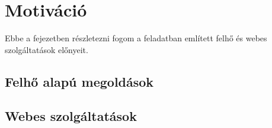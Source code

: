 \section{Motiváció}

Ebbe a fejezetben részletezni fogom a feladatban említett felhő és webes szolgáltatások előnyeit.

\subsection{Felhő alapú megoldások}



\subsection{Webes szolgáltatások}

